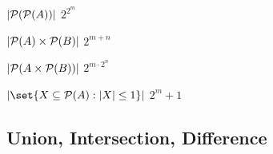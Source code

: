 \documentclass[DIN, pagenumber=false, fontsize=11pt, parskip=half]{scrartcl}
\begin{document}
\begin{problems}[from=14]
    \problem $\lvert \mathcal{P}(\mathcal{P}(A)) \rvert$
    \answer  $2^{2^m}$

    \problem $\lvert \mathcal{P}(A) \times \mathcal{P}(B) \rvert$
    \answer  $2^{m+n}$

    \problem $\lvert \mathcal{P}(A \times \mathcal{P}(B)) \rvert$
    \answer  $2^{m \cdot 2^n}$

    \problem $\abs{\set{X \subseteq \mathcal{P}(A) : \abs{X} \leq 1}}$
    \answer  $2^m + 1$
\end{problems}

\subsection{Union, Intersection, Difference}
\end{document}
